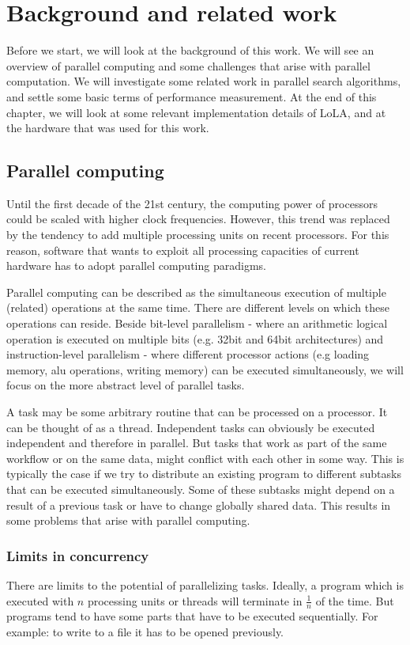 \chapter{Background and related work}
Before we start, we will look at the background of this work. We will see an overview of parallel computing and some challenges that arise with parallel computation. We will investigate some related work in parallel search algorithms, and settle some basic terms of performance measurement. At the end of this chapter, we will look at some relevant implementation details of LoLA, and at the hardware that was used for this work.

\section{Parallel computing}
Until the first decade of the 21st century, the computing power of processors could be scaled with higher clock frequencies. However, this trend was replaced by the tendency to add multiple processing units on recent processors. For this reason, software that wants to exploit all processing capacities of current hardware has to adopt parallel computing paradigms.

Parallel computing can be described as the simultaneous execution of multiple (related) operations at the same time. There are different levels on which these operations can reside. Beside bit-level parallelism - where an arithmetic logical operation is executed on multiple bits (e.g. 32bit and 64bit architectures) and instruction-level parallelism\cite{wall1991limits} - where different processor actions (e.g loading memory, alu operations, writing memory) can be executed simultaneously, we will focus on the more abstract level of parallel tasks.

A task may be some arbitrary routine that can be processed on a processor. It can be thought of as a thread. Independent tasks can obviously be executed independent and therefore in parallel. But tasks that work as part of the same workflow or on the same data, might conflict with each other in some way. This is typically the case if we try to distribute an existing program to different subtasks that can be executed simultaneously. Some of these subtasks might depend on a result of a previous task or have to change globally shared data. This results in some problems that arise with parallel computing.

\subsection{Limits in concurrency}
There are limits to the potential of parallelizing tasks. Ideally, a program which is executed with $n$ processing units or threads will terminate in $\frac{1}{n}$ of the time. But programs tend to have some parts that have to be executed sequentially. For example: to write to a file it has to be opened previously.

